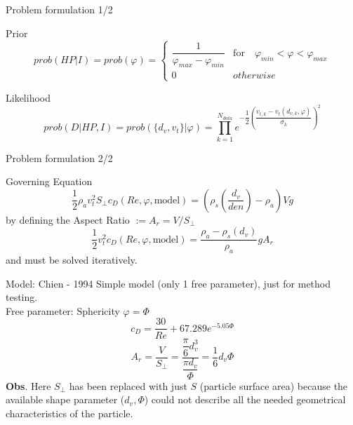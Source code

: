 \documentclass[11pt]{beamer}
\begin{document}
	\begin{frame}{Problem formulation 1/2}
		\begin{block}{Prior}
			\begin{equation*}
				prob(HP|I) = prob(\varphi) = \left\{ 
				\begin{array}{cc}
					\dfrac{1}{\varphi_{max} - \varphi_{min}} & \text{for} \quad \varphi_{min} < \varphi < \varphi_{max}\\
					0 & otherwise
				\end{array} \right.
			\end{equation*}	
		\end{block}
	
		\begin{block}{Likelihood}
			\begin{equation*}
				prob(D|HP,I) = prob(\{d_v, v_t\}|\varphi) = 
				\prod_{k = 1}^{N_{data}} e^{-\dfrac{1}{2} \left(\dfrac{v_{t,k} - v_t(d_{v,k}, \varphi)}{\sigma_k} \right)^2}
			\end{equation*}
		\end{block}
	\end{frame}

	\begin{frame}{Problem formulation 2/2}
		\begin{block}{Governing Equation}
			\begin{equation*}
				\frac{1}{2} \rho_a v_t^2 S_{\perp} c_D(Re, \varphi, \text{model}) = (\rho_s(\frac{d_v}{den}) - \rho_a) V g
			\end{equation*}
			by defining the Aspect Ratio $ := A_r = V / S_{\perp} $
			\begin{equation*}
				\frac{1}{2} v_t^2 c_D(Re, \varphi, \text{model}) = \dfrac{\rho_a - \rho_s(d_v)}{\rho_a} g A_r
			\end{equation*}
			and must be solved iteratively.
		\end{block}
	\end{frame}

	\begin{frame}{Model: Chien - 1994}
		Simple model (only 1 free parameter), just for method testing.\\
		Free parameter: Sphericity $ \varphi = \Phi $
		\begin{equation*}
			c_D = \frac{30}{Re} + 67.289 e^{-5.05 \Phi}
		\end{equation*}
		\begin{equation*}
			A_r = \dfrac{V}{S_{\perp}} = \dfrac{\dfrac{\pi}{6} d_v^3}{\dfrac{\pi d_v}{\Phi}} = \dfrac{1}{6} d_v \Phi
		\end{equation*}
		\textbf{Obs}. Here $ S_{\perp} $ has been replaced with just $ S $ (particle surface area) because the available shape parameter ($ d_v, \Phi $) could not describe all the needed geometrical characteristics of the particle.
	\end{frame}
\end{document}
